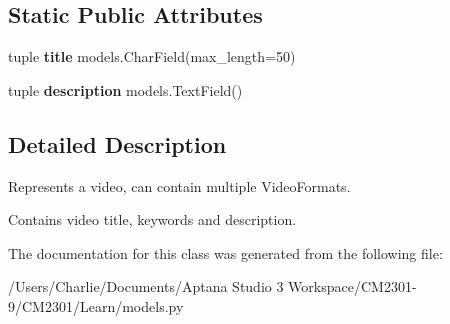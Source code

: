 \subsection*{Static Public Attributes}
\begin{DoxyCompactItemize}
\item 
\hypertarget{class_learn_1_1models_1_1_video_a7c34eae5bb8e4c32a2b45ad5418b78ad}{tuple {\bfseries title} models.\-Char\-Field(max\-\_\-length=50)}\label{class_learn_1_1models_1_1_video_a7c34eae5bb8e4c32a2b45ad5418b78ad}

\item 
\hypertarget{class_learn_1_1models_1_1_video_a77bf282342a37c639a0c017c98a49c8a}{tuple {\bfseries description} models.\-Text\-Field()}\label{class_learn_1_1models_1_1_video_a77bf282342a37c639a0c017c98a49c8a}

\end{DoxyCompactItemize}


\subsection{Detailed Description}
Represents a video, can contain multiple Video\-Formats. 

Contains video title, keywords and description. 

The documentation for this class was generated from the following file\-:\begin{DoxyCompactItemize}
\item 
/\-Users/\-Charlie/\-Documents/\-Aptana Studio 3 Workspace/\-C\-M2301-\/9/\-C\-M2301/\-Learn/models.\-py\end{DoxyCompactItemize}
